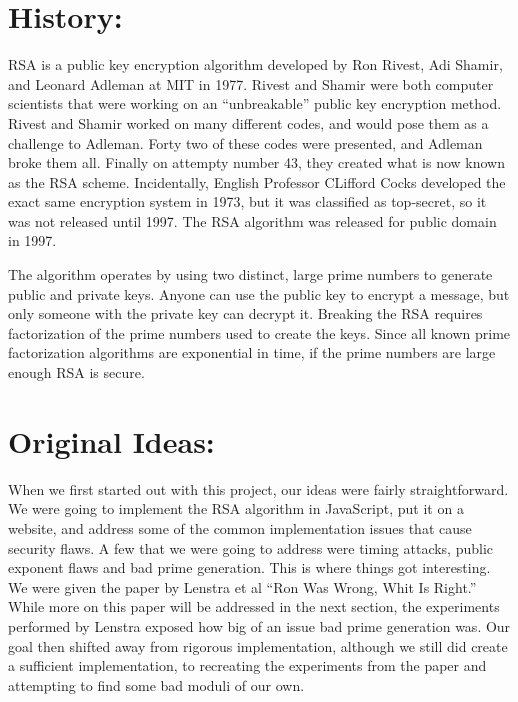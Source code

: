 \documentclass[11pt,twoside]{article}
\begin{document}
\begin{multicols}{2}
\section{History:}
\lettrine[nindent=0em,lines=3]{R} SA is a public key encryption algorithm 
developed by Ron Rivest, Adi Shamir, 
and Leonard Adleman at MIT in 1977. Rivest and Shamir were both computer
scientists that were working on an ``unbreakable'' public key encryption method.
Rivest and Shamir worked on many different codes, and would pose them as a
challenge to Adleman. Forty two of these codes were presented, and Adleman broke
them all. Finally on attempty number 43, they created what is now known as the
RSA scheme. Incidentally, English Professor CLifford Cocks developed the exact
same encryption system in 1973, but it was classified as top-secret, so it was
not released until 1997. The RSA algorithm was released for public domain in
1997.

The algorithm operates by using two distinct, large prime numbers to generate
public and private keys. Anyone can use the public key to encrypt a message, but
only someone with the private key can decrypt it. Breaking the RSA requires
factorization of the prime numbers used to create the keys. Since all known
prime factorization algorithms are exponential in time, if the prime numbers
are large enough RSA is secure.

\section{Original Ideas:}
When we first started out with this project, our ideas were fairly
straightforward. We were going to implement the RSA algorithm in JavaScript, put
it on a website, and address some of the common implementation issues that cause
security flaws. A few that we were going to address were timing attacks, public
exponent flaws and bad prime generation. This is where things got interesting.
We were given the paper by Lenstra et al ``Ron Was Wrong, Whit Is Right.'' While
more on this paper will be addressed in the next section, the experiments
performed by Lenstra exposed how big of an issue bad prime generation was. Our
goal then shifted away from rigorous implementation, although we still did
create a sufficient implementation, to recreating the experiments from the paper
and attempting to find some bad moduli of our own.


\end{multicols}
\end{document}

